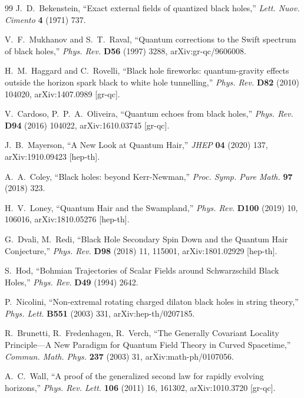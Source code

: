 \documentclass[11pt]{article}
\begin{document}
\begin{thebibliography}{99}
 J.~D.~Bekenstein, ``Exact external fields of quantized black holes,'' \textit{Lett. Nuov. Cimento} \textbf{4} (1971) 737.

 V.~F.~Mukhanov and S.~T.~Raval, ``Quantum corrections to the Swift spectrum of black holes,'' \textit{Phys. Rev.} \textbf{D56} (1997) 3288, arXiv:gr-qc/9606008.

 H.~M.~Haggard and C.~Rovelli, ``Black hole fireworks: quantum-gravity effects outside the horizon spark black to white hole tunnelling,'' \textit{Phys. Rev.} \textbf{D82} (2010) 104020, arXiv:1407.0989 [gr-qc].

 V.~Cardoso, P.~P.~A.~Oliveira, ``Quantum echoes from black holes,'' \textit{Phys. Rev.} \textbf{D94} (2016) 104022, arXiv:1610.03745 [gr-qc].

 J.~B.~Mayerson, ``A New Look at Quantum Hair,'' \textit{JHEP} \textbf{04} (2020) 137, arXiv:1910.09423 [hep-th].

 A.~A.~Coley, ``Black holes: beyond Kerr-Newman,'' \textit{Proc. Symp. Pure Math.} \textbf{97} (2018) 323.

 H.~V.~Loney, ``Quantum Hair and the Swampland,'' \textit{Phys. Rev.} \textbf{D100} (2019) 10, 106016, arXiv:1810.05276 [hep-th].

 G.~Dvali, M.~Redi, ``Black Hole Secondary Spin Down and the Quantum Hair Conjecture,'' \textit{Phys. Rev.} \textbf{D98} (2018) 11, 115001, arXiv:1801.02929 [hep-th].

 S.~Hod, ``Bohmian Trajectories of Scalar Fields around Schwarzschild Black Holes,'' \textit{Phys. Rev.} \textbf{D49} (1994) 2642.

 P.~Nicolini, ``Non-extremal rotating charged dilaton black holes in string theory,'' \textit{Phys. Lett.} \textbf{B551} (2003) 331, arXiv:hep-th/0207185.

 R.~Brunetti, R.~Fredenhagen, R.~Verch, ``The Generally Covariant Locality Principle---A New Paradigm for Quantum Field Theory in Curved Spacetime,'' \textit{Commun. Math. Phys.} \textbf{237} (2003) 31, arXiv:math-ph/0107056.

 A.~C.~Wall, ``A proof of the generalized second law for rapidly evolving horizons,'' \textit{Phys. Rev. Lett.} \textbf{106} (2011) 16, 161302, arXiv:1010.3720 [gr-qc].


\end{thebibliography}
\end{document}
